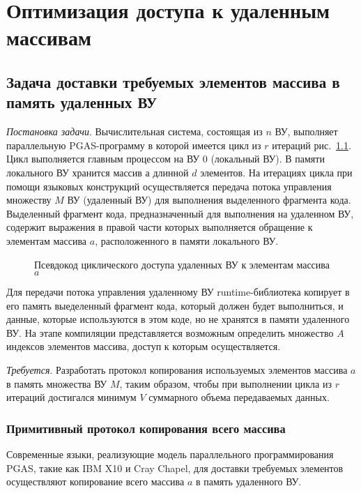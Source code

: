 \chapter{Оптимизация доступа к удаленным массивам} \label{chapt4}
\section{Задача доставки требуемых элементов массива в память удаленных ВУ}
\textit{Постановка задачи}. Вычислительная система, состоящая из $n$ ВУ, 
выполняет параллельную PGAS-программу в которой имеется цикл из $r$ итераций 
рис.~\ref{list:r_iterations_loop}. Цикл выполняется главным процессом на ВУ 0 
(локальный ВУ). В памяти локального ВУ хранится массив $а$ длинной $d$ 
элементов. На итерациях цикла при помощи языковых конструкций осуществляется 
передача потока управления множеству $M$ ВУ (удаленный ВУ) для выполнения 
выделенного фрагмента кода. Выделенный фрагмент кода, предназначенный для 
выполнения на удаленном ВУ, содержит выражения в правой части которых 
выполняется обращение к элементам массива $a$, расположенного в памяти 
локального ВУ.

\begin{figure}[!h]
	
    \caption{Псевдокод циклического доступа удаленных ВУ к элементам массива 
$a$}
    \label{list:r_iterations_loop}
\end{figure}

Для передачи потока управления удаленному ВУ runtime-библиотека копирует в его
память выеделенный фрагмент кода, который должен будет выполниться, и данные,
которые используются в этом коде, но не хранятся в памяти удаленного ВУ.
На этапе компиляции представляется возможным определить множество $A$ индексов
элементов массива, доступ к которым осуществляется.

\textit{Требуется}. Разработать протокол копирования используемых элементов 
массива $a$ в память множества ВУ $M$, таким образом, чтобы при выполнении цикла
из $r$ итераций достигался минимум $V$ суммарного объема передаваемых данных.

\subsection{Примитивный протокол копирования всего массива}
Современные языки, реализующие модель параллельного программирования PGAS,
такие как IBM X10 и Cray Chapel, для доставки требуемых элементов осуществляют
копирование всего массива $a$ в память удаленного ВУ.


